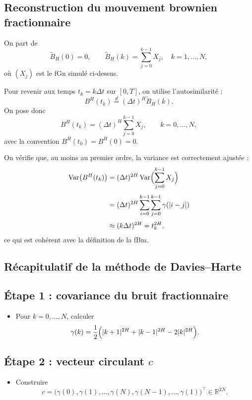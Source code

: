 \documentclass[11pt,a4paper]{article}
\newcommand{\R}{\mathbb{R}}
\newcommand{\Var}{\mathrm{Var}}
\newcommand{\1}{\mathbf{1}}
\newcommand{\bH}{B^{H}}
\begin{document}
\subsection{Reconstruction du mouvement brownien fractionnaire}

On part de
\[
  \widetilde B_H(0) = 0,\qquad
  \widetilde B_H(k) = \sum_{j=0}^{k-1} X_j,\quad k=1,\dots,N,
\]
où $(X_j)$ est le fGn simulé ci-dessus.

Pour revenir aux temps $t_k = k\Delta t$ sur $[0,T]$, on utilise
l'autosimilarité :
\[
  \bH(t_k) \stackrel{d}{=} (\Delta t)^H \widetilde B_H(k).
\]
On pose donc
\begin{equation}
  \boxed{
  \bH(t_k) = (\Delta t)^H \sum_{j=0}^{k-1} X_j,
  \qquad k=0,\dots,N,
  }
\end{equation}
avec la convention $\bH(t_0)=\bH(0)=0$.

On vérifie que, au moins au premier ordre, la variance est correctement
ajustée :
\begin{align}
  \Var\bigl(\bH(t_k)\bigr)
  &= (\Delta t)^{2H}\,\Var\Bigl(\sum_{j=0}^{k-1} X_j\Bigr)
\\[0.3em]
  &= (\Delta t)^{2H}
     \sum_{i=0}^{k-1}\sum_{j=0}^{k-1} \gamma(|i-j|)
\\[0.3em]
  &\approx (k\Delta t)^{2H} = t_k^{2H},
\end{align}
ce qui est cohérent avec la définition de la fBm.

\subsection{Récapitulatif de la méthode de Davies--Harte}

\subsection*{Étape 1 : covariance du bruit fractionnaire}
\begin{itemize}
  \item Pour $k=0,\dots,N$, calculer
    \[
      \gamma(k) = \frac{1}{2}\Bigl(|k+1|^{2H} + |k-1|^{2H} - 2|k|^{2H}\Bigr).
    \]
\end{itemize}

\subsection*{Étape 2 : vecteur circulant $c$}
\begin{itemize}
  \item Construire
    \[
      c = \bigl(
        \gamma(0),\gamma(1),\dots,\gamma(N),
        \gamma(N-1),\dots,\gamma(1)
      \bigr)^\top \in\R^{2N}.
    \]
\end{itemize}
\end{document}
